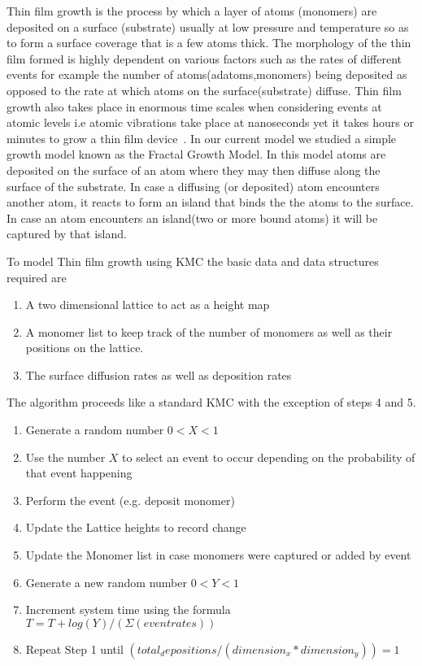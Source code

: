 	Thin film growth is the process by which a layer of atoms (monomers) are deposited on a surface (substrate) usually at low pressure and temperature so as to form a surface coverage that is a few atoms thick. The morphology of the thin film formed is highly dependent on various factors such as the rates of different events for example the number of atoms(adatoms,monomers) being deposited as opposed to the rate at which atoms on the surface(substrate) diffuse. Thin film growth also takes place in enormous time scales when considering events at atomic levels i.e atomic vibrations take place at nanoseconds yet it takes hours or minutes to grow a thin film device~\cite{pc:kmc}.
	In our current model we studied a simple growth model known as the Fractal Growth Model. In this model atoms are deposited on the surface of an atom where they may then diffuse along the surface of the substrate. In case a diffusing (or deposited) atom encounters another atom, it reacts to form an island that binds the the atoms to the surface. In case an atom encounters an island(two or more bound atoms) it will be captured by that island.

To model Thin  film growth using KMC the basic data and data structures required are
\begin{enumerate}
\item A two dimensional lattice to act as a height map
\item A monomer list to keep track of the number of monomers as well as their positions on the lattice.
\item The surface diffusion  rates as well as deposition rates
\end{enumerate}

The algorithm proceeds like a standard KMC with the exception of steps 4 and 5.
\begin{enumerate}
\item Generate a random number $0<X<1$
\item Use the number $X$ to select an event to occur depending on the probability of that event happening
\item Perform the event (e.g. deposit monomer)
\item Update the Lattice heights to record change
\item Update the Monomer list in case monomers were captured or added by event
\item Generate a new random number $0<Y<1$
\item Increment system time using the formula $T=T + log(Y)/(Σ(event rates))$
\item Repeat Step 1 until $(total_depositions/(dimension_x * dimension_y))=1$
\end{enumerate}

